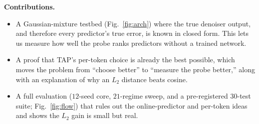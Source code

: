 \documentclass[10pt,twocolumn]{article}
\begin{document}
\noindent\textbf{Contributions.}
\begin{itemize}\setlength\itemsep{0.15ex}
\item A Gaussian-mixture testbed (Fig.~\ref{fig:arch}) where the true denoiser output, and
therefore every predictor's true error, is known in closed form. This lets us measure how
well the probe ranks predictors without a trained network.
\item A proof that TAP's per-token choice is already the best possible, which moves the
problem from ``choose better'' to ``measure the probe better,'' along with an explanation of
why an $L_2$ distance beats cosine.
\item A full evaluation ($12$-seed core, $21$-regime sweep, and a pre-registered $30$-test
suite; Fig.~\ref{fig:flow}) that rules out the online-predictor and per-token ideas and
shows the $L_2$ gain is small but real.
\end{itemize}
\end{document}
